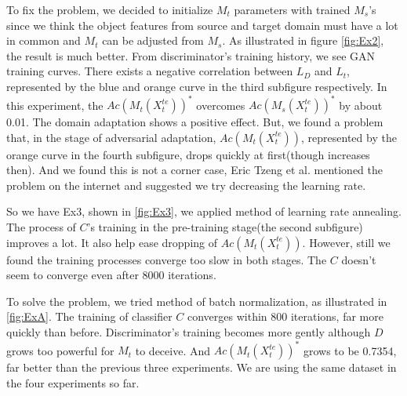 \documentclass[conference]{IEEEtran}
\begin{document}
To fix the problem, we decided to initialize $M_t$ parameters with trained $M_s$'s since we think the object features from source and target domain must have a lot in common and $M_t$ can be adjusted from $M_s$. As illustrated in figure \ref{fig:Ex2}, the result is much better. From discriminator's training history, we see GAN training curves. There exists a negative correlation between $L_D$ and $L_t$, represented by the blue and orange curve in the third subfigure respectively. In this experiment, the $Ac(M_t(X^{te}_t))^*$ overcomes $Ac(M_s(X^{te}_t))^*$ by about 0.01. The domain adaptation shows a positive effect. But, we found a problem that, in the stage of adversarial adaptation, $Ac(M_t(X^{te}_t))$, represented by the orange curve in the fourth subfigure, drops quickly at first(though increases then). And we found this is not a corner case, Eric Tzeng et al. mentioned the problem on the internet and suggested we try decreasing the learning rate.

So we have Ex3, shown in \ref{fig:Ex3}, we applied method of learning rate annealing. The process of $C$'s training in the pre-training stage(the second subfigure) improves a lot. It also help ease dropping of $Ac(M_t(X^{te}_t))$. However, still we found the training processes converge too slow in both stages. The $C$ doesn't seem to converge even after 8000 iterations.

To solve the problem, we tried method of batch normalization, as illustrated in \ref{fig:ExA}. The training of classifier $C$ converges within 800 iterations, far more quickly than before. Discriminator's training becomes more gently although $D$ grows too powerful for $M_t$ to deceive. And $Ac(M_t(X^{te}_t))^*$ grows to be 0.7354, far better than the previous three experiments. We are using the same dataset in the four experiments so far.
\end{document}
